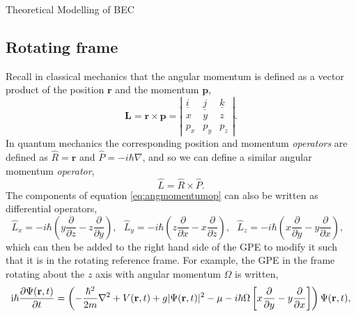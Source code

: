 \begin{chapter}{\label{cha:theoretical_model}Theoretical Modelling of BEC}
	\subsection{\label{section:rotatingframe} Rotating frame}
	Recall in classical mechanics that the angular momentum is defined as a vector product of the position $\mathbf{r}$ and the momentum $\mathbf{p}$,
	\begin{equation*}
		\mathbf{L} = \mathbf{r} \times \mathbf{p} = 
		\left| \begin{array}{ccc}
\underline{i} & \underline{j} & \underline{k} \\
x & y & z \\
p_x & p_y & p_z \end{array} \right|.
	\end{equation*}
	In quantum mechanics the corresponding position and momentum {\it operators} are defined as $\hat{R} = \mathbf{r}$ and $\hat{P} = -i\hbar\nabla$, and so we can define a similar angular momentum {\it operator},
	\begin{equation}\label{eq:angmomentumop}
		\hat{L} = \hat{R} \times \hat{P}.
	\end{equation}
	The components of equation \ref{eq:angmomentumop} can also be written as differential operators,
	\begin{equation}
		\hat{L}_x = -i\hbar\left ( y \frac{\partial}{\partial z} - z \frac{\partial}{\partial y} \right ),~~~
		\hat{L}_y = -i\hbar\left ( z \frac{\partial}{\partial x} - x \frac{\partial}{\partial z} \right ),~~~
		\hat{L}_z = -i\hbar\left ( x \frac{\partial}{\partial y} - y \frac{\partial}{\partial x} \right ),~~~
	\end{equation}
 which can then be added to the right hand side of the GPE to modify it such that it is in the rotating reference frame. For example, the GPE in the frame rotating about the $z$ axis with angular momentum $\Omega$ is written,
	\begin{equation}\label{eq:rotframegpe}
	\mathrm{i}\hbar \frac{\partial\Psi({\bf r},t)}{\partial t} = \left(-\frac{\hbar^2}{2m}\nabla^2 + V({\bf r},t) + g|\Psi({\bf r},t)|^2 - \mu -i\hbar\Omega\left [ x \frac{\partial}{\partial y} - y \frac{\partial}{\partial x} \right ] \right ) \Psi({\bf r},t),
	\end{equation}


\end{chapter}
